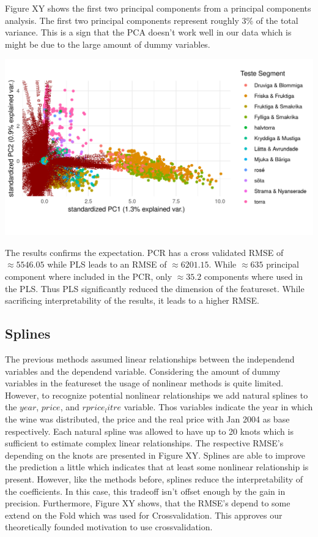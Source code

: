 \documentclass[11pt,]{article}
\begin{document}
Figure XY shows the first two principal components from a principal
components analysis. The first two principal components represent
roughly 3\% of the total variance. This is a sign that the PCA doesn't
work well in our data which is might be due to the large amount of dummy
variables.

\includegraphics{../00_data/output_paper/07_pca.png}

The results confirms the expectation. PCR has a cross validated RMSE of
\(\approx 5546.05\) while PLS leads to an RMSE of \(\approx 6201.15\).
While \(\approx 635\) principal component where included in the PCR,
only \(\approx 35.2\) components where used in the PLS. Thus PLS
significantly reduced the dimension of the featureset. While sacrificing
interpretability of the results, it leads to a higher RMSE.

\hypertarget{splines}{%
\subsection{Splines}\label{splines}}

The previous methods assumed linear relationships between the
independend variables and the dependend variable. Considering the amount
of dummy variables in the featureset the usage of nonlinear methods is
quite limited. However, to recognize potential nonlinear relationships
we add natural splines to the \(year\), \(price\), and \(rprice_litre\)
variable. Thos variables indicate the year in which the wine was
distributed, the price and the real price with Jan 2004 as base
respectively. Each natural spline was allowed to have up to 20 knots
which is sufficient to estimate complex linear relationships. The
respective RMSE's depending on the knots are presented in Figure XY.
Splines are able to improve the prediction a little which indicates that
at least some nonlinear relationship is present. However, like the
methods before, splines reduce the interpretability of the coefficients.
In this case, this tradeoff isn't offset enough by the gain in
precision. Furthermore, Figure XY shows, that the RMSE's depend to some
extend on the Fold which was used for Crossvalidation. This approves our
theoretically founded motivation to use crossvalidation.
\end{document}

